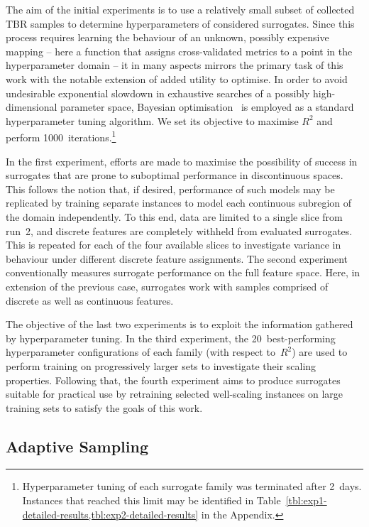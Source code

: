 The aim of the initial experiments is to use a relatively small subset of
collected TBR samples to determine hyperparameters of considered surrogates.
Since this process requires learning the behaviour of an unknown, possibly
expensive mapping -- here a function that assigns cross-validated metrics to a
point in the hyperparameter domain -- it in many aspects mirrors
the primary task of this work with the notable extension of added utility
to optimise. In order to avoid undesirable exponential slowdown in exhaustive
searches of a possibly high-dimensional parameter space, Bayesian
optimisation~\cite{movckus1975bayesian} is employed as a standard hyperparameter tuning algorithm. We set
its objective to maximise $R^2$ and perform
1000~iterations.\footnote{Hyperparameter tuning of each surrogate family was
	terminated after 2~days. Instances that reached this limit may be identified
	in Table~\ref{tbl:exp1-detailed-results,tbl:exp2-detailed-results} in the
	Appendix.}

In the first experiment, efforts are made to maximise the possibility of success
in surrogates that are prone to suboptimal performance in discontinuous spaces.
This follows the notion that, if desired, performance of such models may be
replicated by training separate instances to model each continuous subregion of
the domain independently.
To this end, data are limited to a single slice from run~2, and discrete
features are completely withheld from evaluated
surrogates. This is repeated for each of the four available slices to
investigate variance in behaviour under different discrete feature assignments.
The second experiment conventionally measures surrogate performance on the full
feature space. Here, in extension of the previous case, surrogates work with
samples comprised of discrete as well as continuous features.

The objective of the last two experiments is to exploit the information gathered by
hyperparameter tuning. In the third experiment, the 20~best-performing
hyperparameter configurations of each family (with respect to~$R^2$) are used to
perform training on progressively larger sets to investigate their scaling
properties. Following that, the fourth experiment aims to produce surrogates
suitable for practical use by retraining selected well-scaling instances on large
training sets to satisfy the goals of this work.

\subsection{Adaptive Sampling}
\label{sec:adaptive}


